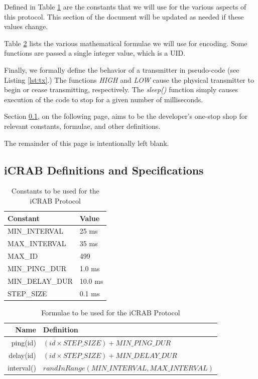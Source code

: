 \documentclass[12pt]{article}
\begin{document}
Defined in Table \ref{table:constants} are the constants that we will use for
the various aspects of this protocol.
This section of the document will be updated as needed if these values
change.

Table \ref{table:formulae} lists the various mathematical formulae we will
use for encoding.
Some functions are passed a single integer value, which is a UID.

Finally, we formally define the behavior of a transmitter in pseudo-code
(see Listing \ref{lst:tx}.)
The functions {\em HIGH} and {\em LOW} cause the physical transmitter to begin
or cease transmitting, respectively.
The {\em sleep()} function simply causes execution of the code to stop for a
given number of milliseconds.

Section \ref{specs}, on the following page,
aims to be the developer's one-stop shop for relevant constants,
formulae, and other definitions.

\vfill

\begin{center}
The remainder of this page is intentionally left blank.
\end{center}

\vfill

\newpage
\subsection{iCRAB Definitions and Specifications} \label{specs}

\begin{table}[ht]
\centering
\begin{tabular}{|l|l|}
\hline
Constant & Value \\
\hline
MIN\_INTERVAL	&	25 ms	\\
MAX\_INTERVAL	&	35 ms	\\
MAX\_ID			&	499		\\
MIN\_PING\_DUR	&	1.0 ms	\\
MIN\_DELAY\_DUR	&	10.0 ms	\\
STEP\_SIZE		&	0.1	ms	\\
\hline
\end{tabular}
\caption{Constants to be used for the iCRAB Protocol}\label{table:constants}
\end{table}

\begin{table}[ht]
\centering
\begin{tabular}{|r|l|}
\hline
Name & Definition \\
\hline
ping(id)		&	$(id \times STEP\_SIZE)+MIN\_PING\_DUR$	\\
delay(id)	&	$(id \times STEP\_SIZE)+MIN\_DELAY\_DUR$	\\
interval()	&	$randInRange(MIN\_INTERVAL, MAX\_INTERVAL)$	\\
\hline
\end{tabular}
\caption{Formulae to be used for the iCRAB Protocol}\label{table:formulae}
\end{table}
\end{document}
